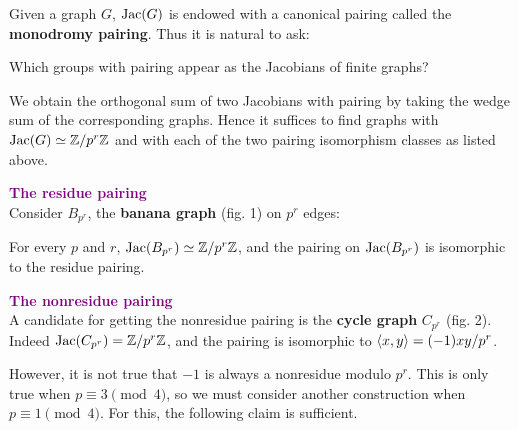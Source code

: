 \documentclass[landscape,final,columns=3]{baposter}
\begin{document}
\begin{poster}
{\begin{multicols}{2}
Given a graph $G$, $\operatorname{Jac}(G)$ is endowed with a canonical pairing called the \textbf{monodromy pairing}. Thus it is natural to ask:

\begin{quest*}
Which groups with pairing appear as the Jacobians of finite graphs?
\end{quest*}

We obtain the orthogonal sum of two Jacobians with pairing by taking the wedge sum of the corresponding graphs. Hence it suffices to find graphs with $\operatorname{Jac}(G)\simeq \mathbb{Z}/p^r\mathbb{Z}$ and with each of the two pairing isomorphism classes as listed above.

\vspace{0.1in}
{\textcolor{purple}{\large{\bf{The residue pairing}}}} \vspace{0.05in}\\
Consider $B_{p^r}$, the \textbf{banana graph} (fig. 1) on $p^r$ edges:

\begin{center}
\end{center}

For every $p$ and $r$, $\operatorname{Jac}(B_{p^r})\simeq\mathbb{Z}/p^r\mathbb{Z}$, and the pairing on $\operatorname{Jac}(B_{p^r})$ is isomorphic to the residue pairing.

\vspace{0.1in}
{\textcolor{purple}{\large{\bf{The nonresidue pairing}}}} \vspace{0.05in}\\
A candidate for getting the nonresidue pairing is the \textbf{cycle graph} $C_{p^r}$ (fig. 2). Indeed $\operatorname{Jac}(C_{p^r})=\mathbb{Z}/p^r\mathbb{Z}$, and the pairing is isomorphic to $\langle x, y \rangle=(-1)xy/p^r$.

However, it is not true that $-1$ is always a nonresidue modulo $p^r$. This is only true when $p\equiv 3\pmod 4$, so we must consider another construction when $p\equiv 1\pmod 4$. For this, the following claim is sufficient. 


\end{multicols}}
\end{poster}
\end{document}
